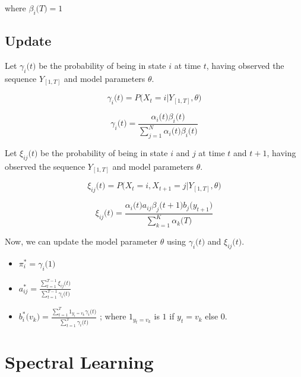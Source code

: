 \documentclass{article} %
\begin{document}
where $\beta_i\big(T\big) = 1$

\subsection*{Update}
Let $\gamma_i\big(t\big)$ be the probability of being in state $i$ at time $t$, having observed the sequence $Y_{[1,T]}$ and model parameters $\theta$.

\[\gamma_i\big(t\big) = P\big( X_t=i|Y_{[1,T]},\theta\big)\]

\[\gamma_i\big(t\big) = \frac{\alpha_i\big(t\big) \beta_i\big(t\big)}{\sum_{j=1}^N \alpha_i\big(t\big) \beta_i\big(t\big) }\]

Let $\xi_{ij}\big(t\big)$ be the probability of being in state $i$ and $j$ at time $t$ and $t+1$, having observed the sequence $Y_{[1,T]}$ and model parameters $\theta$.

\[\xi_{ij}\big(t\big) = P\big( X_t=i,X_{t+1}=j|Y_{[1,T]},\theta\big)\]

\[\xi_{ij}\big(t\big) = \frac{\alpha_i\big(t\big)a_{ij}\beta_j\big(t+1\big)b_j\big(y_{t+1}\big)}{\sum_{k=1}^K \alpha_k\big(T\big)}\]

Now, we can update the model parameter $\theta$ using $\gamma_i\big(t\big)$ and $\xi_{ij}\big(t\big)$.
\begin{itemize}
\item \( \pi_i^* = \gamma_i\big(1\big) \)	
\item \( a_{ij}^* = \frac{\sum_{t=1}^{T-1}\xi_{ij}\big(t\big)}{\sum_{t=1}^{T-1}\gamma_{i}\big(t\big)} \)
\item \( b_i^*\big( v_k \big) = \frac{\sum_{t=1}^{T}1_{y_t=v_k}\gamma_{i}\big(t\big)}{\sum_{t=1}^{T}\gamma_{i}\big(t\big)}\)
;  where $1_{y_t=v_k}$ is $1$ if $y_t=v_k$ else $0$.
\end{itemize}

\section{Spectral Learning}
\label{Spectral Learning}
\end{document}
